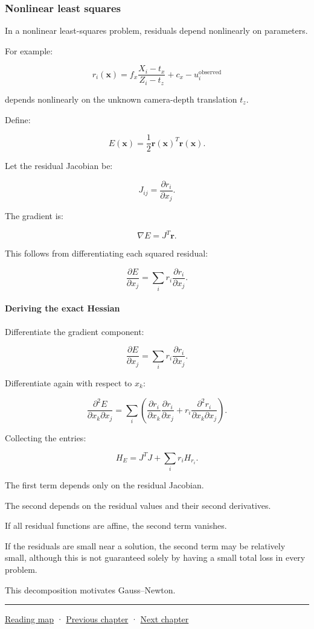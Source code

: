 \subsubsection{Nonlinear least squares}\label{02-foundations-ii-ch026-nonlinear-least-squares}

In a nonlinear least-squares problem, residuals depend nonlinearly on parameters.

For example:

\[
r_i(\mathbf x) = f_x\frac{X_i-t_x}{Z_i-t_z}+c_x-u_i^{\mathrm{observed}}
\]

depends nonlinearly on the unknown camera-depth translation \(t_z\).

Define:

\[
E(\mathbf x)=\frac12\mathbf r(\mathbf x)^T\mathbf r(\mathbf x).
\]

Let the residual Jacobian be:

\[
J_{ij}= \frac{\partial r_i}{\partial x_j}.
\]

The gradient is:

\[
\boxed{ \nabla E=J^T\mathbf r }.
\]

This follows from differentiating each squared residual:

\[
\frac{\partial E}{\partial x_j} = \sum_i r_i\frac{\partial r_i}{\partial x_j}.
\]

\paragraph{Deriving the exact Hessian}\label{02-foundations-ii-ch026-deriving-the-exact-hessian}

Differentiate the gradient component:

\[
\frac{\partial E}{\partial x_j} = \sum_i r_i\frac{\partial r_i}{\partial x_j}.
\]

Differentiate again with respect to \(x_k\):

\[
\frac{\partial^2E}{\partial x_k\partial x_j} = \sum_i \left( \frac{\partial r_i}{\partial x_k} \frac{\partial r_i}{\partial x_j} + r_i\frac{\partial^2r_i}{\partial x_k\partial x_j} \right).
\]

Collecting the entries:

\[
\boxed{ H_E = J^TJ+ \sum_i r_iH_{r_i} }.
\]

The first term depends only on the residual Jacobian.

The second depends on the residual values and their second derivatives.

If all residual functions are affine, the second term vanishes.

If the residuals are small near a solution, the second term may be relatively small, although this is not guaranteed solely by having a small total loss in every problem.

This decomposition motivates Gauss--Newton.

\begin{center}\rule{0.5\linewidth}{0.5pt}\end{center}

\hyperref[volume-reading-map]{Reading map} · \hyperref[02-foundations-ii-ch025-continuous-models-and-numerical-error]{Previous chapter} · \hyperref[02-foundations-ii-ch027-gaussnewton-for-geometry-and-pose]{Next chapter}
